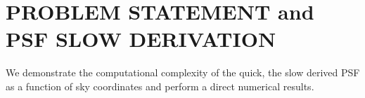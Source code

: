 \section{PROBLEM STATEMENT and PSF SLOW DERIVATION}
We demonstrate the computational complexity of the quick, the slow derived PSF as a function of sky coordinates and 
perform a direct numerical results.

